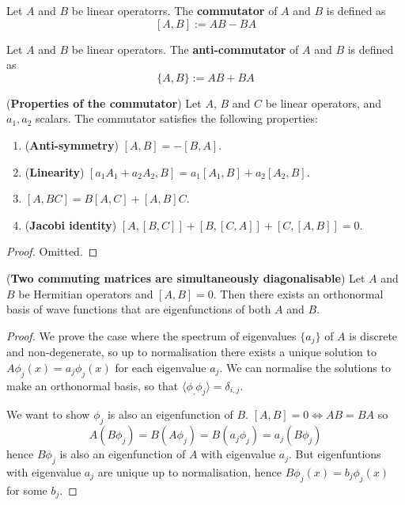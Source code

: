 \begin{definition}
	Let $A$ and $B$ be linear operatorrs. The \textbf{commutator} of $A$ and $B$ is defined as
	\[
		[A, B] := AB - BA
	\]
\end{definition}

\begin{definition}
	Let $A$ and $B$ be linear operators. The \textbf{anti-commutator} of $A$ and $B$ is defined as
	\[
		\{ A, B \} := AB + BA
	\]
\end{definition}

\begin{proposition}
	(\textbf{Properties of the commutator}) Let $A$, $B$ and $C$ be linear operators, and $a_1, a_2$ scalars. The commutator satisfies the following properties:
	\begin{enumerate}
		\item (\textbf{Anti-symmetry}) $[A, B] = -[B, A]$.
		\item (\textbf{Linearity}) $[a_1 A_1 + a_2 A_2, B] = a_1 [A_1, B] + a_2 [A_2, B]$.
		\item $[A, BC] = B[A, C] + [A, B]C$.
		\item (\textbf{Jacobi identity}) $[A, [B, C]] + [B, [C, A]] + [C, [A, B]] = 0$.
	\end{enumerate}
\end{proposition}

\begin{proof}
	Omitted.
\end{proof}

\begin{theorem}\label{thm:commutingOperatorsHaveSameEigenfunctions}
	(\textbf{Two commuting matrices are simultaneously diagonalisable}) Let $A$ and $B$ be Hermitian operators and $[A, B] = 0$. Then there exists an orthonormal basis of wave functions that are eigenfunctions of both $A$ and $B$.
\end{theorem}

\begin{proof}
	We prove the case where the spectrum of eigenvalues $\{ a_j \}$ of $A$ is discrete and non-degenerate, so up to normalisation there exists a unique solution to $A \phi_j(x) = a_j \phi_j(x)$ for each eigenvalue $a_j$. We can normalise the solutions to make an orthonormal basis, so that $\langle \phi_, \phi_j \rangle = \delta_{i, j}$.

	We want to show $\phi_j$ is also an eigenfunction of $B$. $[A, B] = 0 \Longleftrightarrow AB = BA$ so
	\[
		A(B \phi_j) = B (A \phi_j) = B(a_j \phi_j) = a_j (B \phi_j)
	\]
	hence $B \phi_j$ is also an eigenfunction of $A$ with eigenvalue $a_j$. But eigenfuntions with eigenvalue $a_j$ are unique up to normalisation, hence $B \phi_j(x) = b_j \phi_j(x)$ for some $b_j$.
\end{proof}

